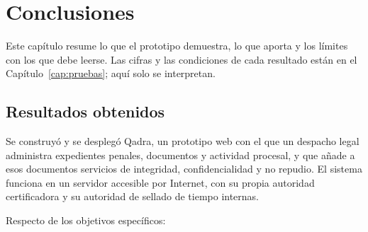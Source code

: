 \chapter{Conclusiones}\label{cap:conclusiones}

Este capítulo resume lo que el prototipo demuestra, lo que aporta y los
límites con los que debe leerse. Las cifras y las
condiciones de cada resultado están en el Capítulo~\ref{cap:pruebas}; aquí
solo se interpretan.

\section{Resultados obtenidos}\label{sec:resultados-obtenidos}

Se construyó y se desplegó Qadra, un prototipo web con el que un despacho legal
administra expedientes penales, documentos y actividad procesal, y que añade a
esos documentos servicios de integridad, confidencialidad y no repudio. El
sistema funciona en un servidor accesible por Internet, con su propia autoridad
certificadora y su autoridad de sellado de tiempo internas.

Respecto de los objetivos específicos:

